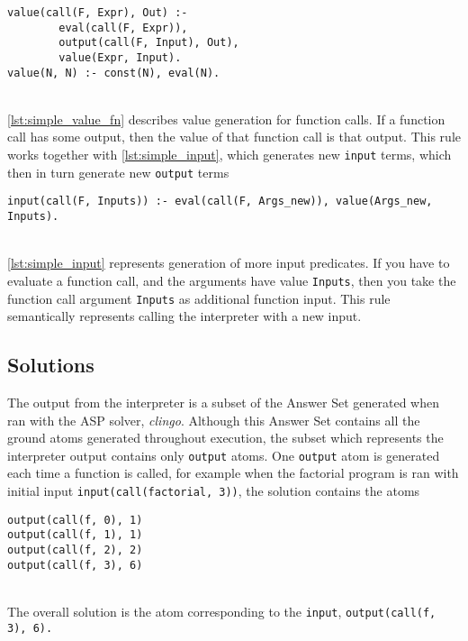 \begin{lstlisting}[caption={Value generation for function calls}, label={lst:simple_value_fn}, firstnumber=79]
value(call(F, Expr), Out) :- 
		eval(call(F, Expr)), 
		output(call(F, Input), Out), 
		value(Expr, Input).	
value(N, N) :- const(N), eval(N).
\end{lstlisting}
\mbox{}\\
\ref{lst:simple_value_fn} describes value generation for function calls. If a function call has some output, then the value of that function call is that output. This rule works together with \ref{lst:simple_input}, which generates new \lstinline!input! terms, which then in turn generate new \lstinline!output! terms\\

\begin{lstlisting}[caption={Input generation}, label={lst:simple_input}, firstnumber=121]
input(call(F, Inputs)) :- eval(call(F, Args_new)), value(Args_new, Inputs).
\end{lstlisting}
\mbox{} \\
\ref{lst:simple_input} represents generation of more input predicates. If you have to evaluate a function call, and the arguments have value \lstinline!Inputs!, then you take the function call argument \lstinline!Inputs! as additional function input. This rule semantically represents calling the interpreter with a new input.

\subsection{Solutions}
The output from the interpreter is a subset of the Answer Set generated when ran with the ASP solver, \textit{clingo}. Although this Answer Set contains all the ground atoms generated throughout execution, the subset which represents the interpreter output contains only \lstinline!output! atoms. One \lstinline!output! atom is generated each time a function is called, for example when the factorial program is ran with initial input \lstinline!input(call(factorial, 3))!, the solution contains the atoms \\

\begin{lstlisting}
output(call(f, 0), 1)
output(call(f, 1), 1) 
output(call(f, 2), 2) 
output(call(f, 3), 6)
\end{lstlisting}
\mbox{}\\
The overall solution is the atom corresponding to the \lstinline!input!, \lstinline!output(call(f, 3), 6).!

